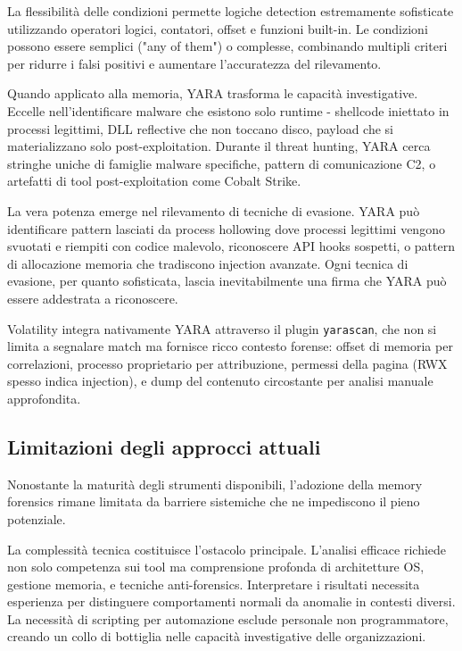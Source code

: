 La flessibilità delle condizioni permette logiche detection estremamente sofisticate utilizzando operatori logici, contatori, offset e funzioni built-in. Le condizioni possono essere semplici ("any of them") o complesse, combinando multipli criteri per ridurre i falsi positivi e aumentare l'accuratezza del rilevamento.

Quando applicato alla memoria, YARA trasforma le capacità investigative. Eccelle nell'identificare malware che esistono solo runtime - shellcode iniettato in processi legittimi, DLL reflective che non toccano disco, payload che si materializzano solo post-exploitation. Durante il threat hunting, YARA cerca stringhe uniche di famiglie malware specifiche, pattern di comunicazione C2, o artefatti di tool post-exploitation come Cobalt Strike.

La vera potenza emerge nel rilevamento di tecniche di evasione. YARA può identificare pattern lasciati da process hollowing dove processi legittimi vengono svuotati e riempiti con codice malevolo, riconoscere API hooks sospetti, o pattern di allocazione memoria che tradiscono injection avanzate. Ogni tecnica di evasione, per quanto sofisticata, lascia inevitabilmente una firma che YARA può essere addestrata a riconoscere.

Volatility integra nativamente YARA attraverso il plugin \texttt{yarascan}, che non si limita a segnalare match ma fornisce ricco contesto forense: offset di memoria per correlazioni, processo proprietario per attribuzione, permessi della pagina (RWX spesso indica injection), e dump del contenuto circostante per analisi manuale approfondita.

\subsection{Limitazioni degli approcci attuali}

Nonostante la maturità degli strumenti disponibili, l'adozione della memory forensics rimane limitata da barriere sistemiche che ne impediscono il pieno potenziale.

La complessità tecnica costituisce l'ostacolo principale. L'analisi efficace richiede non solo competenza sui tool ma comprensione profonda di architetture OS, gestione memoria, e tecniche anti-forensics. Interpretare i risultati necessita esperienza per distinguere comportamenti normali da anomalie in contesti diversi. La necessità di scripting per automazione esclude personale non programmatore, creando un collo di bottiglia nelle capacità investigative delle organizzazioni.

